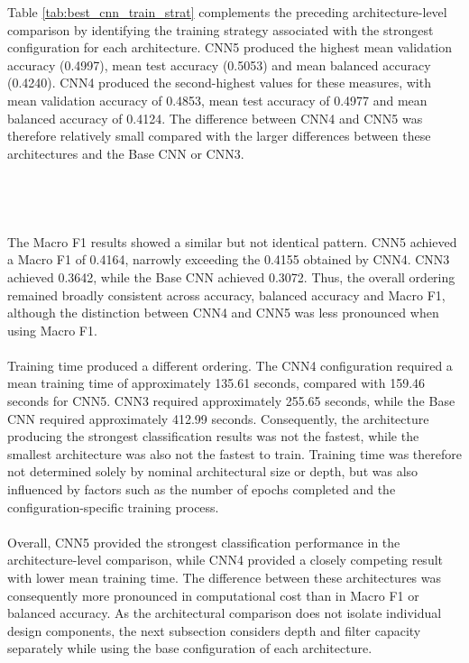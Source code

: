 \documentclass[12pt, a4paper]{report}
\begin{document}
				Table \ref{tab:best_cnn_train_strat} complements the preceding architecture-level comparison by identifying the training strategy associated with the strongest configuration for each architecture. CNN5 produced the highest mean validation accuracy (0.4997), mean test accuracy (0.5053) and mean balanced accuracy (0.4240). CNN4 produced the second-highest values for these measures, with mean validation accuracy of 0.4853, mean test accuracy of 0.4977 and mean balanced accuracy of 0.4124. The difference between CNN4 and CNN5 was therefore relatively small compared with the larger differences between these architectures and the Base CNN or CNN3.\\\\\\\\\\
				The Macro F1 results showed a similar but not identical pattern. CNN5 achieved a Macro F1 of 0.4164, narrowly exceeding the 0.4155 obtained by CNN4. CNN3 achieved 0.3642, while the Base CNN achieved 0.3072. Thus, the overall ordering remained broadly consistent across accuracy, balanced accuracy and Macro F1, although the distinction between CNN4 and CNN5 was less pronounced when using Macro F1.\\\\
				Training time produced a different ordering. The CNN4 configuration required a mean training time of approximately 135.61 seconds, compared with 159.46 seconds for CNN5. CNN3 required approximately 255.65 seconds, while the Base CNN required approximately 412.99 seconds. Consequently, the architecture producing the strongest classification results was not the fastest, while the smallest architecture was also not the fastest to train. Training time was therefore not determined solely by nominal architectural size or depth, but was also influenced by factors such as the number of epochs completed and the configuration-specific training process.\\\\
				Overall, CNN5 provided the strongest classification performance in the architecture-level comparison, while CNN4 provided a closely competing result with lower mean training time. The difference between these architectures was consequently more pronounced in computational cost than in Macro F1 or balanced accuracy. As the architectural comparison does not isolate individual design components, the next subsection considers depth and filter capacity separately while using the base configuration of each architecture.\\
\end{document}

